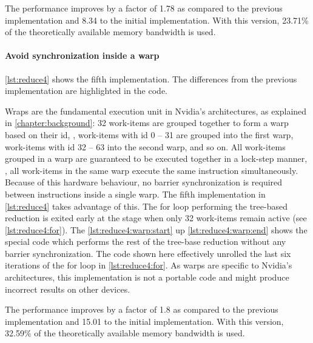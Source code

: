 The performance improves by a factor of 1.78 as compared to the previous implementation and 8.34 to the initial implementation.
With this version, 23.71\% of the theoretically available memory bandwidth is used.



\FloatBarrier
\newpage
\paragraph{Avoid synchronization inside a warp}

\autoref{lst:reduce4} shows the fifth implementation.
The differences from the previous implementation are highlighted in the code.

Wraps are the fundamental execution unit in Nvidia's \GPU architectures, as explained in \autoref{chapter:background}:
32 work-items are grouped together to form a warp based on their id, \ie, work-items with id 0 -- 31 are grouped into the first warp, work-items with id 32 -- 63 into the second warp, and so on.
All work-items grouped in a warp are guaranteed to be executed together in a lock-step manner, \ie, all work-items in the same warp execute the same instruction simultaneously.
Because of this hardware behaviour, no barrier synchronization is required between instructions inside a single warp.
The fifth implementation in \autoref{lst:reduce4} takes advantage of this.
The for loop performing the tree-based reduction is exited early at the stage when only 32 work-items remain active (see \autoref{lst:reduce4:for}).
The \autoref{lst:reduce4:warp:start} up \autoref{lst:reduce4:warp:end} shows the special code which performs the rest of the tree-base reduction without any barrier synchronization.
The code shown here effectively unrolled the last six iterations of the for loop in \autoref{lst:reduce4:for}.
As warps are specific to Nvidia's \GPU architectures, this implementation is not a portable \OpenCL code and might produce incorrect results on other \OpenCL devices.

The performance improves by a factor of 1.8 as compared to the previous implementation and 15.01 to the initial implementation.
With this version, 32.59\% of the theoretically available memory bandwidth is used.

